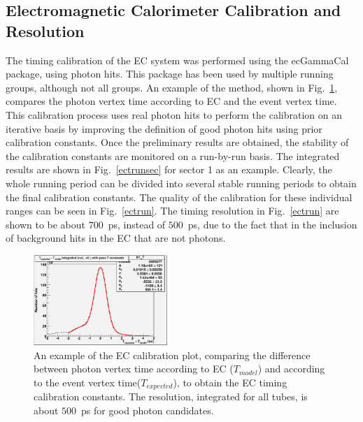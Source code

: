 \subsection{\label{sec:calib.ec}Electromagnetic Calorimeter Calibration and Resolution}
The timing calibration of the EC system was performed using the ecGammaCal package, using photon hits. This package has been used by multiple running groups, although not all groups. An example of the method, shown in Fig.~\ref{ectall}, compares the photon vertex time according to EC and the event vertex time. This calibration process uses real photon hits to perform the calibration on an iterative basis by improving the definition of good photon hits using prior calibration constants. Once the preliminary results are obtained, the stability of the calibration constants are monitored on a run-by-run basis. The integrated results are shown in Fig.~\ref{ectrunsec} for sector 1 as an example. Clearly, the whole running period can be divided into several stable running periods to obtain the final calibration constants. The quality of the calibration for these individual ranges can be seen in Fig.~\ref{ectrun}. The timing resolution in Fig.~\ref{ectrun} are shown to be about $700$~ps, instead of $500$~ps, due to the fact that in the inclusion of background hits in the EC that are not photons.

\begin{figure}[h]
\begin{center}
 \includegraphics[width=0.45\textwidth]{figures/calib/ec/ec_vtimeall.eps}
  \caption{An example of the EC calibration plot, comparing the difference between photon vertex time according to EC ($T_{model}$) and according to the event vertex time($T_{expected}$), to obtain the EC timing calibration constants. The resolution, integrated for all tubes, is about $500$~ps for good photon candidates.}
  \label{ectall}
  \end{center}
\end{figure}


